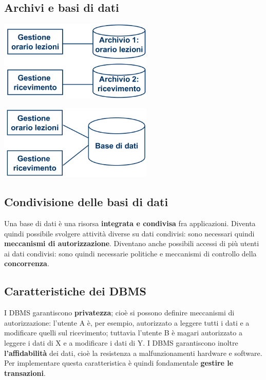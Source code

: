 \documentclass[12pt]{article}
\begin{document}
\subsection{Archivi e basi di dati}
\begin{center}
    \includegraphics[width = 0.55\textwidth]{Images/3.PNG}
\end{center}
\begin{center}
    \includegraphics[width = 0.55\textwidth]{Images/4.PNG}
\end{center}
\subsection{Condivisione delle basi di dati}
Una base di dati è una risorsa \textbf{integrata e condivisa} fra applicazioni.
Diventa quindi possibile svolgere attività diverse su dati condivisi: sono necessari quindi \textbf{meccanismi di autorizzazione}.
Diventano anche possibili accessi di più utenti ai dati condivisi: sono quindi necessarie politiche e meccanismi di controllo della \textbf{concorrenza}.
\subsection{Caratteristiche dei DBMS}
I DBMS garantiscono \textbf{privatezza}; cioè si possono definire meccanismi di autorizzazione: l'utente A è, per esempio, autorizzato a leggere tutti i dati e a modificare quelli sul ricevimento; tuttavia
l'utente B è magari autorizzato a leggere i dati di X e a modificare i dati di Y. \newline
I DBMS garantiscono inoltre \textbf{l'affidabilità} dei dati, cioè la resistenza a malfunzionamenti hardware e software.
Per implementare questa caratteristica è quindi fondamentale \textbf{gestire le transazioni}.
\end{document}
